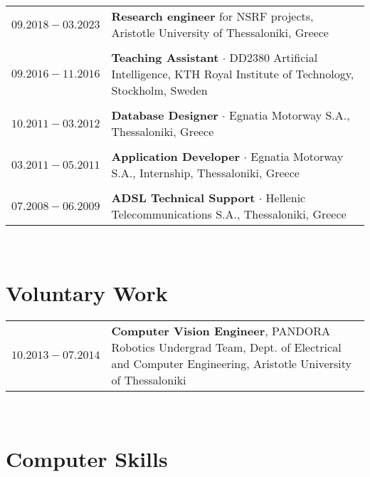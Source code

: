 \documentclass[a4paper,10pt,twoside]{article}
\begin{document}
\begin{tabular}{rp{12cm}}
$09.2018 - 03.2023$ & \textbf{Research engineer} for NSRF projects, Aristotle University of Thessaloniki, Greece\\
&\\
$09.2016 - 11.2016$ & \textbf{Teaching Assistant} $\cdot$ DD2380 Artificial Intelligence, KTH Royal Institute of Technology, Stockholm, Sweden\\
&\\
$10.2011 - 03.2012$ & \textbf{Database Designer} $\cdot$ Egnatia Motorway S.A., Thessaloniki, Greece \\
&\\
$03.2011 - 05.2011$ & \textbf{Application Developer} $\cdot$ Egnatia Motorway S.A., Internship, Thessaloniki, Greece\\
&\\
$07.2008 - 06.2009$ & \textbf{ADSL Technical Support} $\cdot$ Hellenic Telecommunications S.A., Thessaloniki, Greece\\
\end{tabular} \\



\section{Voluntary Work}

\begin{tabular}{rp{12cm}}
$10.2013 - 07.2014$ & \textbf{Computer Vision Engineer}, PANDORA Robotics Undergrad Team,
Dept. of Electrical and Computer Engineering, Aristotle University of Thessaloniki \\
\end{tabular} \\



\section{Computer Skills}
\end{document}
